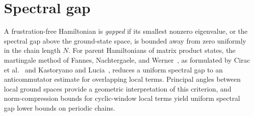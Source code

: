 
\section{Spectral gap}\label{sec:spectral_gap}

A frustration-free Hamiltonian is \emph{gapped} if its smallest nonzero
eigenvalue, or the spectral gap above the ground-state space, is bounded away from
zero uniformly in the chain length $N$.
For parent Hamiltonians of matrix product states, the martingale method of
Fannes, Nachtergaele, and Werner~\cite{Fannes1992Finitely, Nachtergaele1996Spectral},
as formulated by Cirac et al.~\cite[Section~IV.C]{Cirac2021Matrix}
and Kastoryano and Lucia~\cite{Kastoryano2018Martingale}, reduces a uniform
spectral gap to an anticommutator estimate for overlapping local terms.
Principal angles between local ground spaces provide a geometric interpretation
of this criterion, and norm-compression bounds for cyclic-window local terms
yield uniform spectral gap lower bounds on periodic chains.



